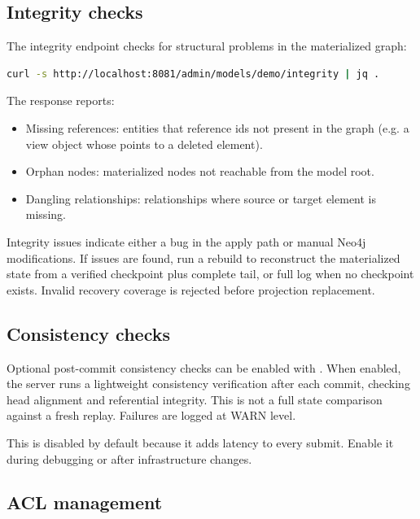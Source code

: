 \subsection{Integrity checks}

The integrity endpoint checks for structural problems in the materialized
graph:

\begin{lstlisting}[language=bash,caption={Check integrity}]
curl -s http://localhost:8081/admin/models/demo/integrity | jq .
\end{lstlisting}

The response reports:

\begin{itemize}
\item Missing references: entities that reference ids not present in the
  graph (e.g. a view object whose  points to a deleted
  element).
\item Orphan nodes: materialized nodes not reachable from the model root.
\item Dangling relationships: relationships where source or target element
  is missing.
\end{itemize}

Integrity issues indicate either a bug in the apply path or manual Neo4j
modifications. If issues are found, run a rebuild to reconstruct the
materialized state from a verified checkpoint plus complete tail, or full log
when no checkpoint exists. Invalid recovery coverage is rejected before
projection replacement.

\subsection{Consistency checks}

Optional post-commit consistency checks can be enabled with
. When enabled, the server runs
a lightweight consistency verification after each 
commit, checking head alignment and referential integrity. This is not a full
state comparison against a fresh replay. Failures are logged at WARN level.

This is disabled by default because it adds latency to every submit.
Enable it during debugging or after infrastructure changes.

\subsection{ACL management}

